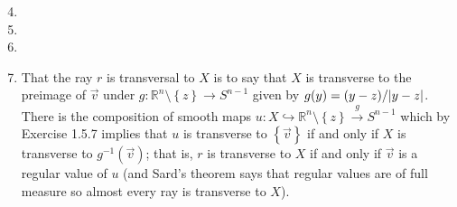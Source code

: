 \documentclass[11pt,leqno]{article}
\theoremstyle{plain}
\theoremstyle{definition}
\numberwithin{equation}{section}
\numberwithin{lem}{section}
\newcommand{\cbr}[1]{\left\{#1\right\}}
\begin{document}
\begin{enumerate}
    \setcounter{enumi}{3}
    \item 
    \item 
    \item 
    \item That the ray $r$ is transversal to $X$ is to say that $X$ is transverse to the preimage of $\vec v$ under $g\colon \mathbb R^n\setminus\cbr{z}\to S^{n-1}$ given by $g(y) = (y-z)/\abs{y-z}$. There is the composition of smooth maps $u\colon X\hookrightarrow \mathbb R^n\setminus\cbr{z}\xrightarrow{g}S^{n-1}$ which by Exercise 1.5.7 implies that $u$ is transverse to $\cbr{\vec v}$ if and only if $X$ is transverse to $g^{-1}(\vec v)$; that is, $r$ is transverse to $X$ if and only if $\vec v$ is a regular value of $u$ (and Sard's theorem says that regular values are of full measure so almost every ray is transverse to $X$).
    

\end{enumerate}
\end{document}
